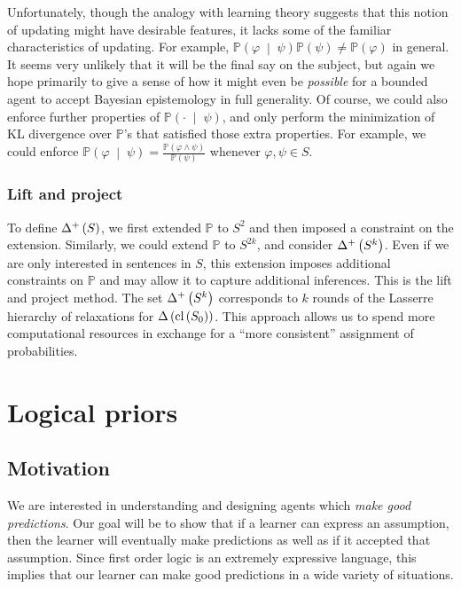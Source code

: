 \documentclass[12pt]{article}
\theoremstyle{definition}
\newcommand{\of}[1]{\left(#1\right)}
\newcommand{\ofc}[2]{\left(#1\;\middle\vert\;#2\right)}
\newcommand{\PP}{\mathbb{P}}
\newcommand{\Pc}[2]{\PP\ofc{#1}{#2}}
\renewcommand{\P}[1]{\mathbb{P}\of{#1}}
\newcommand{\vp}{\varphi}
\begin{document}
Unfortunately, though the analogy with learning
theory suggests that this notion of updating might have desirable
features, it lacks some of the familiar characteristics of updating.
For example, $\Pc{\vp}{\psi} \P{\psi} \neq \P{\vp}$ in general.
It seems very unlikely that it will be the final say on the subject,
but again we hope primarily to give a sense of how it might even be
\emph{possible} for a bounded agent to accept Bayesian epistemology
in full generality.
Of course, we could also enforce further properties of $\Pc{\cdot}{\psi}$,
and only perform the minimization of KL divergence over $\PP$'s that satisfied
those extra properties.
For example, we could enforce $\Pc{\vp}{\psi} = \frac {\P{\vp \wedge \psi}}{\P{\psi}}$
whenever $\vp, \psi \in S$.

\subsubsection{Lift and project}

To define $\Dp{S}$, we first extended $\PP$ to $S^2$
and then imposed a constraint on the extension.
Similarly, we could extend $\PP$ to $S^{2k}$,
and consider $\Dp{S^k}$.
Even if we are only interested in sentences in $S$,
this extension imposes additional constraints on $\PP$
and may allow it to capture additional inferences.
This is the lift and project method.
The set $\Dp{S^k}$ corresponds to $k$ rounds of the Lasserre hierarchy of relaxations
for $\D{\clS}$. %
This approach allows us to spend more computational resources in exchange
for a ``more consistent'' assignment of probabilities.

\section{Logical priors}\label{priors}

\subsection{Motivation}

We are interested in understanding and designing agents which
\emph{make good predictions}.
Our goal will be to show that if a learner
can express an assumption,
then the learner will eventually make predictions
as well as if it accepted that assumption.
Since first order logic is an extremely expressive language,
this implies that our learner can make good predictions
in a wide variety of situations.
\end{document}
